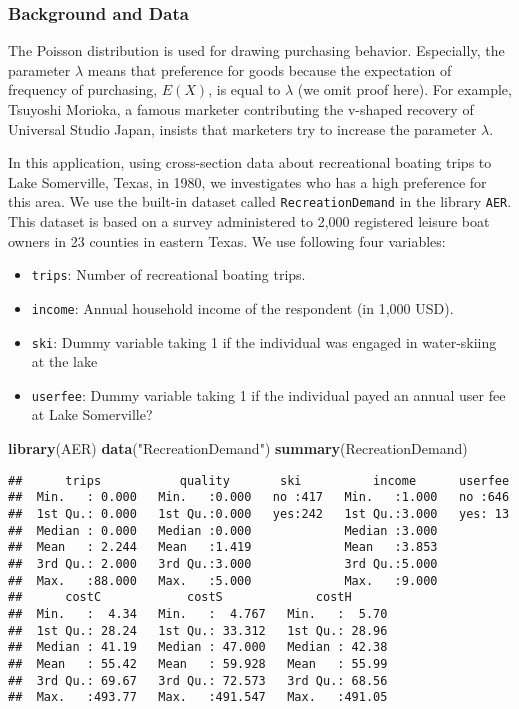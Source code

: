 \documentclass[
  12pt,
]{article}
\newenvironment{Shaded}{\begin{snugshade}}{\end{snugshade}}
\newcommand{\KeywordTok}[1]{\textcolor[rgb]{0.13,0.29,0.53}{\textbf{#1}}}
\newcommand{\NormalTok}[1]{#1}
\newcommand{\StringTok}[1]{\textcolor[rgb]{0.31,0.60,0.02}{#1}}
\providecommand{\tightlist}{%
  \setlength{\itemsep}{0pt}\setlength{\parskip}{0pt}}
\begin{document}
\hypertarget{background-and-data-5}{%
\subsubsection{Background and Data}\label{background-and-data-5}}

The Poisson distribution is used for drawing purchasing behavior.
Especially, the parameter \(\lambda\) means that preference for goods because
the expectation of frequency of purchasing, \(E(X)\), is equal to \(\lambda\) (we omit proof here).
For example, Tsuyoshi Morioka, a famous marketer contributing the v-shaped recovery of Universal Studio Japan,
insists that marketers try to increase the parameter \(\lambda\).

In this application, using cross-section data about recreational boating trips to Lake Somerville, Texas, in 1980,
we investigates who has a high preference for this area.
We use the built-in dataset called \texttt{RecreationDemand} in the library \texttt{AER}.
This dataset is based on a survey administered to 2,000 registered leisure boat owners in 23 counties in eastern Texas.
We use following four variables:

\begin{itemize}
\tightlist
\item
  \texttt{trips}: Number of recreational boating trips.
\item
  \texttt{income}: Annual household income of the respondent (in 1,000 USD).
\item
  \texttt{ski}: Dummy variable taking 1 if the individual was engaged in water-skiing at the lake
\item
  \texttt{userfee}: Dummy variable taking 1 if the individual payed an annual user fee at Lake Somerville?
\end{itemize}

\begin{Shaded}
\begin{Highlighting}[]
\KeywordTok{library}\NormalTok{(AER)}
\KeywordTok{data}\NormalTok{(}\StringTok{"RecreationDemand"}\NormalTok{)}
\KeywordTok{summary}\NormalTok{(RecreationDemand)}
\end{Highlighting}
\end{Shaded}

\begin{verbatim}
##      trips           quality       ski          income      userfee  
##  Min.   : 0.000   Min.   :0.000   no :417   Min.   :1.000   no :646  
##  1st Qu.: 0.000   1st Qu.:0.000   yes:242   1st Qu.:3.000   yes: 13  
##  Median : 0.000   Median :0.000             Median :3.000            
##  Mean   : 2.244   Mean   :1.419             Mean   :3.853            
##  3rd Qu.: 2.000   3rd Qu.:3.000             3rd Qu.:5.000            
##  Max.   :88.000   Max.   :5.000             Max.   :9.000            
##      costC            costS             costH       
##  Min.   :  4.34   Min.   :  4.767   Min.   :  5.70  
##  1st Qu.: 28.24   1st Qu.: 33.312   1st Qu.: 28.96  
##  Median : 41.19   Median : 47.000   Median : 42.38  
##  Mean   : 55.42   Mean   : 59.928   Mean   : 55.99  
##  3rd Qu.: 69.67   3rd Qu.: 72.573   3rd Qu.: 68.56  
##  Max.   :493.77   Max.   :491.547   Max.   :491.05
\end{verbatim}
\end{document}
